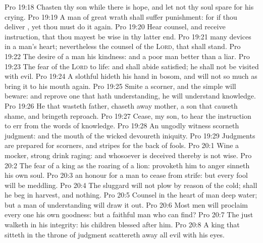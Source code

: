 \vs Pro 19:18 Chasten thy son while there is hope, and let not thy soul spare for his crying.
\vs Pro 19:19 A man of great wrath shall suffer punishment: for if thou deliver , yet thou must do it again.
\vs Pro 19:20 Hear counsel, and receive instruction, that thou mayest be wise in thy latter end.
\vs Pro 19:21  many devices in a man's heart; nevertheless the counsel of the \textsc{Lord}, that shall stand.
\vs Pro 19:22 The desire of a man  his kindness: and a poor man  better than a liar.
\vs Pro 19:23 The fear of the \textsc{Lord}  to life: and  shall abide satisfied; he shall not be visited with evil.
\vs Pro 19:24 A slothful  hideth his hand in  bosom, and will not so much as bring it to his mouth again.
\vs Pro 19:25 Smite a scorner, and the simple will beware: and reprove one that hath understanding,  he will understand knowledge.
\vs Pro 19:26 He that wasteth  father,  chaseth away  mother,  a son that causeth shame, and bringeth reproach.
\vs Pro 19:27 Cease, my son, to hear the instruction  to err from the words of knowledge.
\vs Pro 19:28 An ungodly witness scorneth judgment: and the mouth of the wicked devoureth iniquity.
\vs Pro 19:29 Judgments are prepared for scorners, and stripes for the back of fools.
\vs Pro 20:1 Wine  a mocker, strong drink  raging: and whosoever is deceived thereby is not wise.
\vs Pro 20:2 The fear of a king  as the roaring of a lion:  provoketh him to anger sinneth  his own soul.
\vs Pro 20:3  an honour for a man to cease from strife: but every fool will be meddling.
\vs Pro 20:4 The sluggard will not plow by reason of the cold;  shall he beg in harvest, and  nothing.
\vs Pro 20:5 Counsel in the heart of man  deep water; but a man of understanding will draw it out.
\vs Pro 20:6 Most men will proclaim every one his own goodness: but a faithful man who can find?
\vs Pro 20:7 The just  walketh in his integrity: his children  blessed after him.
\vs Pro 20:8 A king that sitteth in the throne of judgment scattereth away all evil with his eyes.
